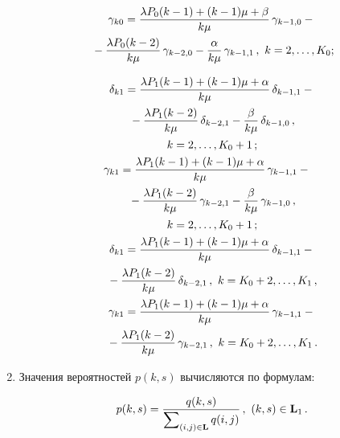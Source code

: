 \begin{multicols}{2}
\begin{enumerate}[1.]
\vspace*{-12pt}

\begin{multline*}
\gamma_{k0} = \displaystyle\frac{\displaystyle \lambda P_0(k-1)+(k-1)\mu+\beta\mathstrut}{\displaystyle k\mu\mathstrut}\,\gamma_{k-1,0}-{}\\
{}-
\displaystyle\frac{\displaystyle \lambda P_0(k-2)\mathstrut}{\displaystyle k\mu\mathstrut}\,\gamma_{k-2,0} -\displaystyle\frac{\displaystyle \alpha\mathstrut}{\displaystyle k\mu\mathstrut}\,\gamma_{k-
1,1}\,,\ k=2,\ldots,K_0;\hspace*{-1.73058pt}
\end{multline*}


\noindent
\begin{gather*}
\delta_{k1} = \fr{\lambda P_1(k-1)+(k-1)\mu+\alpha}{k\mu}\,\delta_{k-1,1} - {}\\
{}-
\fr{\lambda P_1(k-2)}{k\mu}\,\delta_{k-2,1} -\fr{\beta}{k\mu}\,\delta_{k-1,0}\,,\\ 
k=2,\ldots ,K_0+1\,;\\
\hspace*{-3mm}\gamma_{k1} =\fr{\lambda P_1(k-1)+(k-1)\mu+\alpha}{k\mu}\,\gamma_{k-1,1} - {}\\
{}-
\fr{\lambda P_1(k-2)}{k\mu}\,\gamma_{k-2,1}- \fr{\beta}{k\mu}\,\gamma_{k-
1,0}\,,\\ 
k=2,\ldots ,K_0+1\,;\\
\delta_{k1} = \fr{\lambda P_1(k-1)+(k-1)\mu+\alpha}{k\mu}\,\delta_{k-1,1}- {}\\
{}-
\fr{\lambda P_1(k-2)}{k\mu}\,\delta_{k-2,1}\,,\   k=K_0+2,\ldots , K_1\,,\\
\gamma_{k1} =\fr{\lambda P_1(k-1)+(k-1)\mu+\alpha}{k\mu}\,\gamma_{k-1,1} - {}\\
{}-
\fr{\lambda P_1(k-2)}{k\mu}\,\gamma_{k-2,1}\,,\ k=K_0+2,\ldots ,K_1\,.
\end{gather*}

\item Значения вероятностей $p(k,s)$ вычисляются по формулам:

\noindent
$$
p(k,s)=\displaystyle\frac{\displaystyle q(k,s)\mathstrut}{\displaystyle \sum\nolimits_{(i,j)\in \mathbf{L}} q(i,j)\mathstrut}\,,\ (k,s)\in 
\mathbf{L}_1\,.
$$
\end{enumerate}

\begin{table*}\small
  \begin{center}
  \vspace*{2ex}
  

\end{center}
\end{table*}
\end{multicols}
